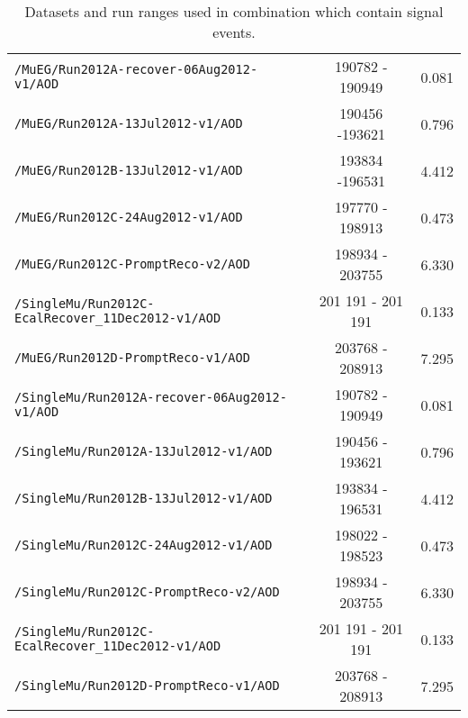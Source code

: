 \begin{table}[hbt]
\begin{center}
\begin{tabular}{lcc}
\verb=/MuEG/Run2012A-recover-06Aug2012-v1/AOD=                          &      190782 - 190949     & 0.081            \\ 
\verb=/MuEG/Run2012A-13Jul2012-v1/AOD=                                          &  190456 -193621         & 0.796             \\ 
\verb=/MuEG/Run2012B-13Jul2012-v1/AOD=                                         &  193834 -196531      & 4.412 \\ 
\verb=/MuEG/Run2012C-24Aug2012-v1/AOD=                                      &   197770 - 198913     & 0.473               \\ 
\verb=/MuEG/Run2012C-PromptReco-v2/AOD=                                     &   198934 - 203755      & 6.330              \\ 
\verb=/SingleMu/Run2012C-EcalRecover_11Dec2012-v1/AOD=          & 201 191 - 201 191 & 0.133\\
\verb=/MuEG/Run2012D-PromptReco-v1/AOD=                                     &  203768 - 208913  &  7.295 \\

\verb=/SingleMu/Run2012A-recover-06Aug2012-v1/AOD=                    &   190782 - 190949          & 0.081          \\ 
\verb=/SingleMu/Run2012A-13Jul2012-v1/AOD=                                     &  190456 - 193621      & 0.796                \\ 
\verb=/SingleMu/Run2012B-13Jul2012-v1/AOD=                                     &  193834 - 196531  & 4.412 \\ 
\verb=/SingleMu/Run2012C-24Aug2012-v1/AOD=                                   &   198022 - 198523     & 0.473               \\ 
\verb=/SingleMu/Run2012C-PromptReco-v2/AOD=                                  &   198934 - 203755    & 6.330                \\ 
\verb=/SingleMu/Run2012C-EcalRecover_11Dec2012-v1/AOD=          & 201 191 - 201 191 & 0.133 \\
\verb=/SingleMu/Run2012D-PromptReco-v1/AOD=                                  &  203768 - 208913   &  7.295 \\



 \hline\hline
\end{tabular}
\caption{\label{tab:DilDsets}Datasets and run ranges used in combination which contain signal events.}
\end{center}
\end{table}

